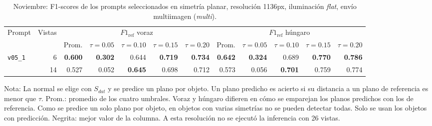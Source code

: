 \begin{table}[htbp]
\centering
\caption{Noviembre: F1-scores de los prompts seleccionados en simetría planar, resolución 1136px, iluminación \textit{flat}, envío multiimagen (\textit{multi}).}
\label{tab:nov_plane_1136_f1}
\begin{lrbox}{\tablebox}
\begin{adjustbox}{max width=\textwidth}
\begin{tabular}{lrrrrrrrrrrr}
\toprule
\multirow{2}{*}{Prompt} & \multirow{2}{*}{Vistas} & \multicolumn{5}{c}{$F1_{\mathrm{ref}}$ voraz} & \multicolumn{5}{c}{$F1_{\mathrm{ref}}$ húngaro} \\
\cmidrule(lr){3-7} \cmidrule(lr){8-12}
 &  & Prom. & $\tau{=}0.05$ & $\tau{=}0.10$ & $\tau{=}0.15$ & $\tau{=}0.20$ & Prom. & $\tau{=}0.05$ & $\tau{=}0.10$ & $\tau{=}0.15$ & $\tau{=}0.20$ \\
\midrule
\multirow{2}{*}{\texttt{v05\_1}} & 6 & \textbf{0.600} & \textbf{0.302} & 0.644 & \textbf{0.719} & \textbf{0.734} & \textbf{0.642} & \textbf{0.324} & 0.689 & \textbf{0.770} & \textbf{0.786} \\
 & 14 & 0.527 & 0.052 & \textbf{0.645} & 0.698 & 0.712 & 0.573 & 0.056 & \textbf{0.701} & 0.759 & 0.774 \\
\bottomrule
\end{tabular}
\end{adjustbox}
\end{lrbox}
\usebox{\tablebox}

\vspace{1.5ex}
\begin{minipage}{\wd\tablebox}
\footnotesize
Nota: La normal se elige con $S_{dat}$ y se predice un plano por objeto. Un plano predicho es acierto si su distancia a un plano de referencia es menor que $\tau$. Prom.: promedio de los cuatro umbrales. Voraz y húngaro difieren en cómo se emparejan los planos predichos con los de referencia. Como se predice un solo plano por objeto, en objetos con varias simetrías no se pueden detectar todas. Solo se usan los objetos con predicción. Negrita: mejor valor de la columna. A esta resolución no se ejecutó la inferencia con 26 vistas.
\end{minipage}
\end{table}

\clearpage

